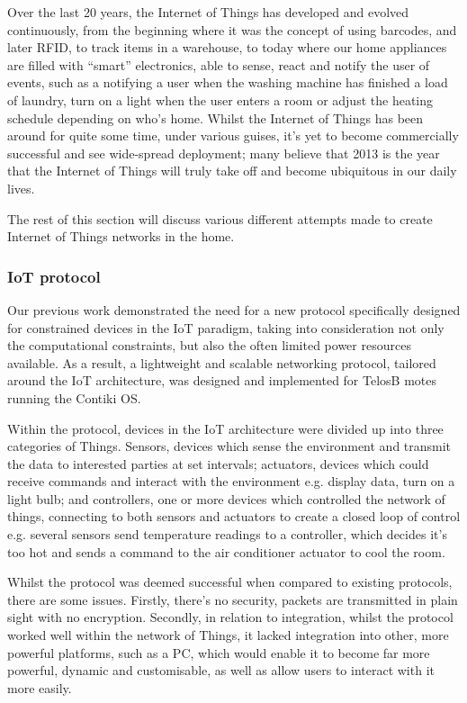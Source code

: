Over the last 20 years, the Internet of Things has developed and evolved continuously, from the beginning where it was the concept of using barcodes, and later RFID\cite{K.Ashton}, to track items in a warehouse, to today where our home appliances are filled with ``smart'' electronics, able to sense, react and notify the user of events, such as a notifying a user when the washing machine has finished a load of laundry, turn on a light when the user enters a room or adjust the heating schedule depending on who's home. Whilst the Internet of Things has been around for quite some time, under various guises, it's yet to become commercially successful and see wide-spread deployment; many believe that 2013 is the year that the Internet of Things will truly take off and become ubiquitous in our daily lives\cite{2013IoT}.

The rest of this section will discuss various different attempts made to create Internet of Things networks in the home.

\subsubsection{IoT protocol} %
\label{ssub:knot}
Our previous work\cite{KNoT} demonstrated the need for a new protocol specifically designed for constrained devices in the IoT paradigm, taking into consideration not only the computational constraints, but also the often limited power resources available. As a result, a lightweight and scalable networking protocol, tailored around the IoT architecture, was designed and implemented for TelosB motes running the Contiki OS. 

Within the protocol, devices in the IoT architecture were divided up into three categories of Things. Sensors, devices which sense the environment and transmit the data to interested parties at set intervals; actuators, devices which could receive commands and interact with the environment e.g. display data, turn on a light bulb; and controllers, one or more devices which controlled the network of things, connecting to both sensors and actuators to create a closed loop of control e.g. several sensors send temperature readings to a controller, which decides it's too hot and sends a command to the air conditioner actuator to cool the room. 

Whilst the protocol was deemed successful when compared to existing protocols, there are some issues. Firstly, there's no security, packets are transmitted in plain sight with no encryption. Secondly, in relation to integration, whilst the protocol worked well within the network of Things, it lacked integration into other, more powerful platforms, such as a PC, which would enable it to become far more powerful, dynamic and customisable, as well as allow users to interact with it more easily. 

